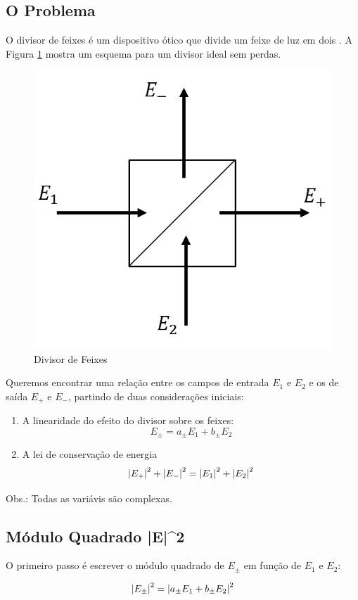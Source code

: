 \documentclass[12pt,a4paper]{report}
\begin{document}
\subsection{O Problema}

O divisor de feixes é um dispositivo ótico que divide um feixe de luz em dois \cite{Loudon448s}. A Figura \ref{beam.splitter} mostra um esquema para um divisor ideal sem perdas.

\begin{figure}[H]
    \centering
    \includegraphics[width=0.3\linewidth]{beamsplitter.png}
    \caption{Divisor de Feixes}
    \label{beam.splitter}
\end{figure}

Queremos encontrar uma relação entre os campos de entrada $E_1$ e $E_2$ e os de saída $E_+$ e $E_{-}$, partindo de duas considerações iniciais:

\begin{enumerate}
    \item A linearidade do efeito do divisor sobre os feixes:
    \begin{equation}
        E_{\pm}=a_{\pm}E_1+b_{\pm}E_2
        \label{linearidade}
    \end{equation}
    \item A lei de conservação de energia
    \begin{equation}
        \abs{E_{+}}^2+\abs{E_{-}}^2=\abs{E_{1}}^2+\abs{E_{2}}^2
        \label{conservacao}
    \end{equation}
\end{enumerate}

Obs.: Todas as variávis são complexas.

\subsection{Módulo Quadrado |E|^2}

O primeiro passo é escrever o módulo quadrado de $E_{\pm}$ em função de $E_1$ e $E_2$:

\begin{equation}
    \abs{E_{\pm}}^2=\abs{a_{\pm}E_1+b_{\pm}E_2}^2
    \label{modulo.quadrado}
\end{equation}
\end{document}
